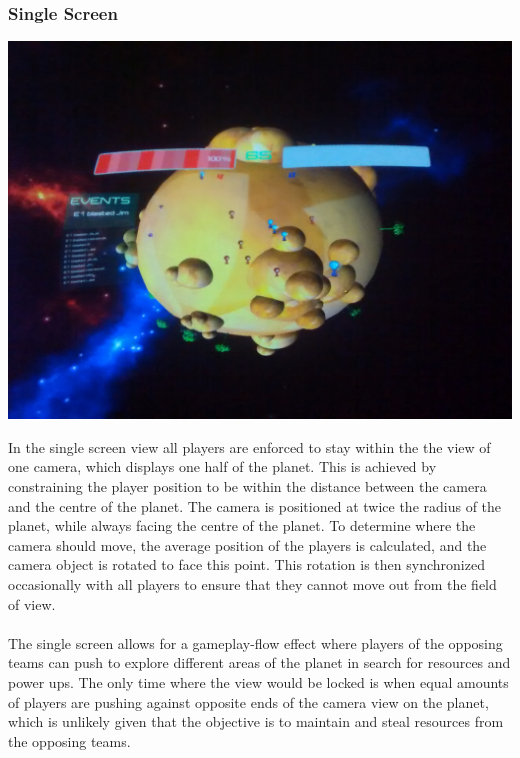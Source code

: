 \documentclass[11pt,a4paper]{article}
\begin{document}
   \subsubsection{Single Screen}
      \begin{center}
   \includegraphics[scale=0.05]{logos/single.jpg}
   \end{center}
    In the single screen view all players are enforced to stay within the the view of one camera, which displays one half of the planet. This is achieved by constraining the player position to be within the distance between the camera and the centre of the planet. The camera is positioned at twice the radius of the planet, while always facing the centre of the planet. To determine where the camera should move, the average position of the players is calculated, and the camera object is rotated to face this point. This rotation is then synchronized occasionally with all players to ensure that they cannot move out from the field of view. \\ \\

    \noindent
    The single screen allows for a gameplay-flow effect where players of the opposing teams can push to explore different areas of the planet in search for resources and power ups. The only time where the view would be locked is when equal amounts of players are pushing against opposite ends of the camera view on the planet, which is unlikely given that the objective is to maintain and steal resources from the opposing teams. \\ \\
\end{document}
